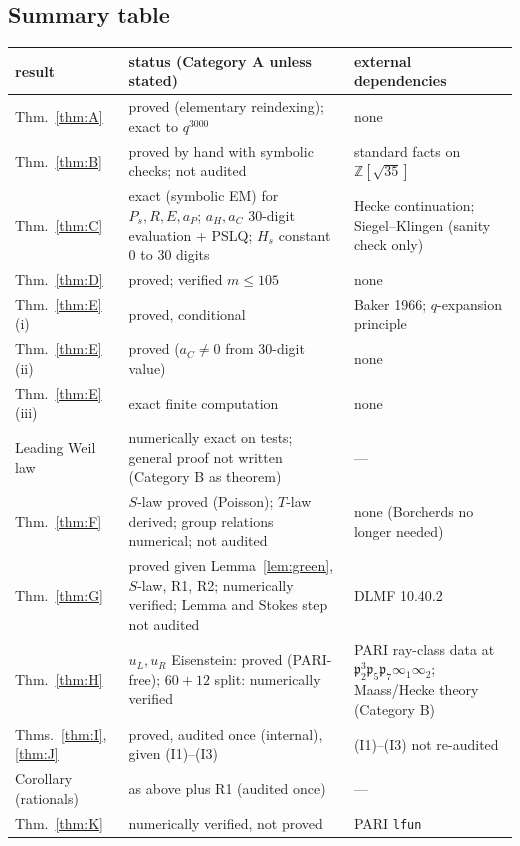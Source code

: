 \documentclass[11pt]{article}
\theoremstyle{definition}
\newcommand{\Z}{\mathbb{Z}}
\newcommand{\fp}{\mathfrak{p}}
\begin{document}
\subsection{Summary table}
\begin{center}\small
\begin{longtable}{p{2.6cm}p{6.6cm}p{5.6cm}}\toprule
result & status (Category A unless stated) & external dependencies\\\midrule\endhead
Thm.~\ref{thm:A} & proved (elementary reindexing); exact to $q^{3000}$ & none\\
Thm.~\ref{thm:B} & proved by hand with symbolic checks; not audited & standard facts on $\Z[\sqrt{35}]$\\
Thm.~\ref{thm:C} & exact (symbolic EM) for $P_s,R,E,a_P$; $a_H,a_C$ 30-digit evaluation + PSLQ; $H_s$ constant $0$ to 30 digits & Hecke continuation; Siegel--Klingen (sanity check only)\\
Thm.~\ref{thm:D} & proved; verified $m\le105$ & none\\
Thm.~\ref{thm:E}(i) & proved, conditional & Baker 1966; $q$-expansion principle\\
Thm.~\ref{thm:E}(ii) & proved ($a_C\neq0$ from 30-digit value) & none\\
Thm.~\ref{thm:E}(iii) & exact finite computation & none\\
Leading Weil law & numerically exact on tests; general proof not written (Category B as theorem) & ---\\
Thm.~\ref{thm:F} & $S$-law proved (Poisson); $T$-law derived; group relations numerical; not audited & none (Borcherds no longer needed)\\
Thm.~\ref{thm:G} & proved given Lemma~\ref{lem:green}, $S$-law, R1, R2; numerically verified; Lemma and Stokes step not audited & DLMF 10.40.2\\
Thm.~\ref{thm:H} & $u_L,u_R$ Eisenstein: proved (PARI-free); $60+12$ split: numerically verified & PARI ray-class data at $\fp_2^3\fp_5\fp_7\infty_1\infty_2$; Maass/Hecke theory (Category B)\\
Thms.~\ref{thm:I}, \ref{thm:J} & proved, audited once (internal), given (I1)--(I3) & (I1)--(I3) not re-audited\\
Corollary (rationals) & as above plus R1 (audited once) & ---\\
Thm.~\ref{thm:K} & numerically verified, not proved & PARI \texttt{lfun}\\\bottomrule
\end{longtable}
\end{center}
\end{document}
